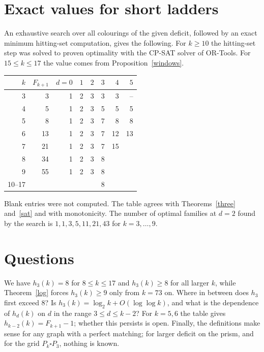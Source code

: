 \documentclass[11pt]{article}
\theoremstyle{remark}
\begin{document}
\section{Exact values for short ladders}\label{exact}
An exhaustive search over all colourings of the given deficit, followed by
an exact minimum hitting-set computation, gives the following. For
\(k\ge10\) the hitting-set step was solved to proven optimality with the
CP-SAT solver of OR-Tools. For \(15\le k\le17\) the value comes from Proposition~\ref{windows}.
\begin{center}\small
\begin{tabular}{@{}rrrrrrrr@{}}
\toprule
\(k\) & \(F_{k+1}\) & \(d=0\) & \(1\) & \(2\) & \(3\) & \(4\) & \(5\)\\
\midrule
3 & 3  & 1 & 2 & 3 & 3 & 3 & --\\
4 & 5  & 1 & 2 & 3 & 5 & 5 & 5\\
5 & 8  & 1 & 2 & 3 & 7 & 8 & 8\\
6 & 13 & 1 & 2 & 3 & 7 & 12 & 13\\
7 & 21 & 1 & 2 & 3 & 7 & 15 &\\
8 & 34 & 1 & 2 & 3 & 8 & &\\
9 & 55 & 1 & 2 & 3 & 8 & &\\
10--17 & & & & & 8 & &\\
\bottomrule
\end{tabular}
\end{center}
Blank entries were not computed. The table agrees with Theorems~\ref{three} and~\ref{sat} and with
monotonicity. The number of optimal families at \(d=2\) found by the search
is \(1,1,3,5,11,21,43\) for \(k=3,\dots,9\).

\section{Questions}
We have \(h_3(k)=8\) for \(8\le k\le17\) and \(h_3(k)\ge8\) for all larger
\(k\), while Theorem~\ref{log} forces \(h_3(k)\ge9\) only from \(k=73\) on.
Where in between does \(h_3\) first exceed \(8\)? Is \(h_3(k)=\log_2 k+O(\log\log k)\), and what is
the dependence of \(h_d(k)\) on \(d\) in the range \(3\le d\le k-2\)?
For \(k=5,6\) the table gives
\(h_{k-2}(k)=F_{k+1}-1\); whether this persists is open.
Finally, the definitions make sense for any graph with a perfect matching;
for larger deficit on the prism, and for the grid \(P_k\square P_3\), nothing is known.
\end{document}
